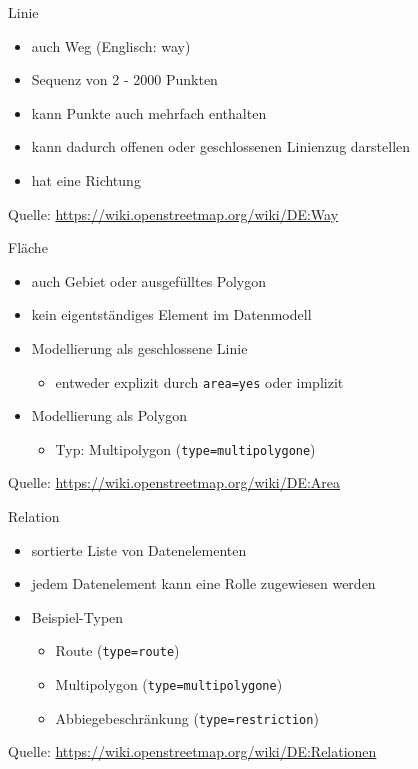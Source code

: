 \documentclass{beamer}
\begin{document}
\begin{frame}[fragile]{Linie}
\begin{itemize}
  \item auch Weg (Englisch: way)
  \item Sequenz von 2 - 2000 Punkten
  \item kann Punkte auch mehrfach enthalten
  \item kann dadurch offenen oder geschlossenen Linienzug darstellen
  \item hat eine Richtung
\end{itemize}

Quelle: \url{https://wiki.openstreetmap.org/wiki/DE:Way}

\end{frame}
\begin{frame}[fragile]{Fläche}

\begin{itemize}
  \item auch Gebiet oder ausgefülltes Polygon
  \item kein eigentständiges Element im Datenmodell
  \item Modellierung als geschlossene Linie
  \begin{itemize}
    \item entweder explizit durch \texttt{area=yes} oder implizit
  \end{itemize}
  \item Modellierung als Polygon
  \begin{itemize}
    \item Typ: Multipolygon (\texttt{type=multipolygone})
  \end{itemize}
\end{itemize}
Quelle: \url{https://wiki.openstreetmap.org/wiki/DE:Area}
\end{frame}
\begin{frame}{Relation}
\begin{itemize}
  \item sortierte Liste von Datenelementen
  \item jedem Datenelement kann eine Rolle zugewiesen werden
  \item Beispiel-Typen
  \begin{itemize}
    \item Route (\texttt{type=route})
    \item Multipolygon (\texttt{type=multipolygone})
    \item Abbiegebeschränkung (\texttt{type=restriction})
   \end{itemize}
\end{itemize}
Quelle: \url{https://wiki.openstreetmap.org/wiki/DE:Relationen}
\end{frame}
\end{document}
